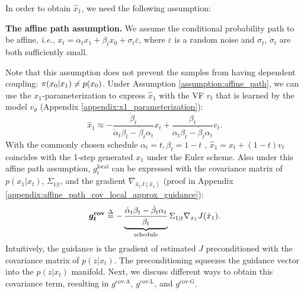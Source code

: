 In order to obtain $\hat{x}_1$, we need the following assumption:
\begin{assumption}\label{assumption:affine_path}
    \textbf{The affine path assumption.} We assume the conditional probability path to be affine, \textit{i.e.}, $x_t = \alpha_t x_1 + \beta_t x_0 + \sigma_t\varepsilon$, where $\varepsilon$ is a random noise and $\sigma_t$, $\dot\sigma_t$ are both sufficiently small.\footnotemark
\end{assumption}



Note that this assumption does not prevent the samples from having dependent coupling: $\pi(x_0|x_1) \neq p(x_0)$.
Under Assumption \ref{assumption:affine_path}, we can use the $x_1$-parameterization \citep{lipman_flow_2024} to express $\hat{x}_1$ with the VF $v_t$ that is learned by the model $v_\theta$ (Appendix \ref{appendix:x1_parameterization}):
\vspace{-5pt}
\begin{equation}\label{eq:local_approx_guidance_affine_path_estimate_x1}
    \hat{x}_1 \approx -\frac{\dot\beta_t}{\dot \alpha_t \beta_t - \dot \beta_t \alpha_t} x_t + \frac{\beta_t}{\dot \alpha_t \beta_t - \dot \beta_t \alpha_t} v_t.
\end{equation}
With the commonly chosen schedule $\alpha_t = t, \beta_t = 1 - t$ \citep{lipman_flow_2023,tong_improving_2024}, $\hat{x}_1 = x_t + (1 - t) v_t$ coincides with the 1-step generated $x_1$ under the Euler scheme.
Also under this affine path assumption, $g^{\text{local}}_t$ can be expressed with the covariance matrix of $p(x_1|x_t)$, $\Sigma_{1|t}$, and the gradient $\nabla_{\hat{x}_1 J(\hat{x}_1)}$ (proof in Appendix \ref{appendix:affine_path_cov_local_approx_guidance}): 
\begin{equation}\label{eq:g_cov}
    \bm{g_t^{\textbf{cov}}} \defg -\underbrace{\frac{\dot\alpha_t\beta_t - \dot\beta_t\alpha_t}{\beta_t}}_{\text{schedule}} \Sigma_{1|t} \nabla_{\hat{x}_1}J(\hat{x}_1).
    \vspace{-5pt}
\end{equation}
Intuitively, the guidance is the gradient of estimated $J$ preconditioned with the covariance matrix of $p(z|x_t)$. The preconditioning squeezes the guidance vector into the $p(z|x_t)$ manifold. Next, we discuss different ways to obtain this covariance term, resulting in $g^{\text{cov-A}}$, $g^{\text{cov-L}}$, and $g^{\text{cov-G}}$.

